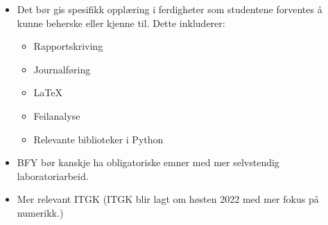 \begin{itemize}
	\item Det bør gis spesifikk opplæring i ferdigheter som studentene forventes å kunne beherske eller kjenne til. Dette inkluderer:
	\begin{itemize}
		\item Rapportskriving
		\item Journalføring
		\item LaTeX
		\item Feilanalyse
		\item Relevante biblioteker i Python
	\end{itemize}
	\item BFY bør kanskje ha obligatoriske emner med mer selvstendig laboratoriarbeid.
	\item Mer relevant ITGK (ITGK blir lagt om høsten 2022 med mer fokus på numerikk.)
\end{itemize}
